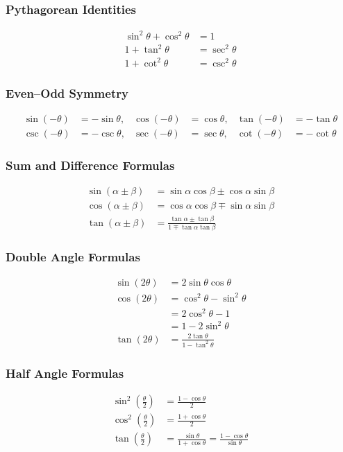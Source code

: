 \documentclass[12pt]{article}
\begin{document}
\subsubsection*{Pythagorean Identities}
\begin{align*}
\sin^2 \theta + \cos^2 \theta &= 1 \\
1 + \tan^2 \theta &= \sec^2 \theta \\
1 + \cot^2 \theta &= \csc^2 \theta
\end{align*}

\subsubsection*{Even–Odd Symmetry}
\begin{align*}
\sin(-\theta) &= -\sin \theta, &
\cos(-\theta) &= \cos \theta, &
\tan(-\theta) &= -\tan \theta \\
\csc(-\theta) &= -\csc \theta, &
\sec(-\theta) &= \sec \theta, &
\cot(-\theta) &= -\cot \theta
\end{align*}

\subsubsection*{Sum and Difference Formulas}
\begin{align*}
\sin(\alpha \pm \beta) &= \sin \alpha \cos \beta \pm \cos \alpha \sin \beta \\
\cos(\alpha \pm \beta) &= \cos \alpha \cos \beta \mp \sin \alpha \sin \beta \\
\tan(\alpha \pm \beta) &= \frac{\tan \alpha \pm \tan \beta}{1 \mp \tan \alpha \tan \beta}
\end{align*}

\subsubsection*{Double Angle Formulas}
\begin{align*}
\sin(2\theta) &= 2\sin \theta \cos \theta \\
\cos(2\theta) &= \cos^2 \theta - \sin^2 \theta \\
&= 2\cos^2 \theta - 1 \\
&= 1 - 2\sin^2 \theta \\
\tan(2\theta) &= \frac{2\tan \theta}{1 - \tan^2 \theta}
\end{align*}

\subsubsection*{Half Angle Formulas}
\begin{align*}
\sin^2\!\left(\frac{\theta}{2}\right) &= \frac{1 - \cos \theta}{2} \\
\cos^2\!\left(\frac{\theta}{2}\right) &= \frac{1 + \cos \theta}{2} \\
\tan\!\left(\frac{\theta}{2}\right) &= \frac{\sin \theta}{1 + \cos \theta} 
= \frac{1 - \cos \theta}{\sin \theta}
\end{align*}
\end{document}
